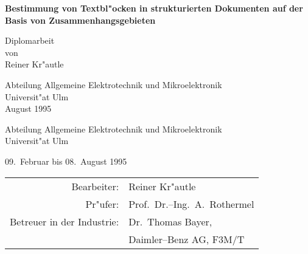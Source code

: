 \thispagestyle{empty}
%
%
\begin{center}
  \Large\bf
  Bestimmung von Textbl"ocken in strukturierten
  Dokumenten auf der Basis von Zusammenhangsgebieten
\end{center}

\vfill

\begin{center}
  \large
  Diplomarbeit\\
  von\\
  Reiner Kr"autle
\end{center}

\vfill

\begin{center}
  Abteilung Allgemeine Elektrotechnik und Mikroelektronik\\
  Universit"at Ulm\\
  August 1995
\end{center}

\newpage\thispagestyle{empty}

\begin{center}
  \large
  Abteilung Allgemeine Elektrotechnik und Mikroelektronik\\
  Universit"at Ulm
\end{center}
\vfill

\centerline{09.\ Februar bis 08.\ August 1995}
\vfill

\begin{center}
  \begin{large}
    \begin{tabular}{rl}
      Bearbeiter:                & Reiner Kr"autle              \\[5mm]
      Pr"ufer:                   & Prof.~Dr.--Ing.~A.~Rothermel \\[5mm]
      Betreuer in der Industrie: & Dr.~Thomas Bayer,            \\
                                 & Daimler--Benz AG, F3M/T
    \end{tabular}
  \end{large}
\end{center}

